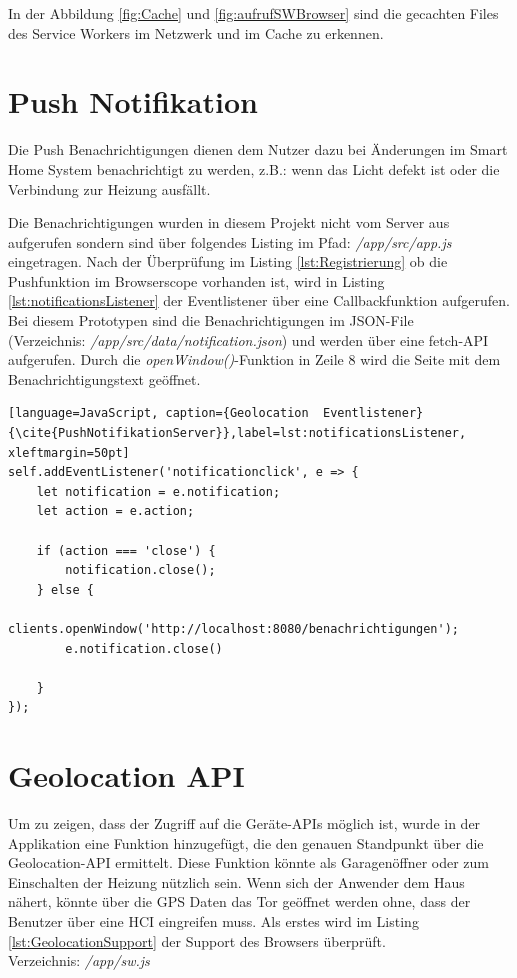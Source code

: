 In der Abbildung \ref{fig:Cache} und \ref{fig:aufrufSWBrowser} sind die gecachten Files des Service Workers im Netzwerk und im Cache zu erkennen.



\clearpage
\section{Push Notifikation}
Die Push Benachrichtigungen dienen dem Nutzer dazu bei Änderungen im Smart Home System benachrichtigt zu werden, z.B.: wenn das Licht defekt ist oder die Verbindung zur Heizung ausfällt.

Die Benachrichtigungen wurden in diesem Projekt nicht vom Server aus aufgerufen sondern sind über folgendes Listing im Pfad: \textit{/app/src/app.js} eingetragen. 
Nach der Überprüfung im Listing \ref{lst:Registrierung} ob die Pushfunktion im Browserscope vorhanden ist, wird in Listing \ref{lst:notificationsListener} der  Eventlistener über eine Callbackfunktion aufgerufen. Bei diesem Prototypen sind die Benachrichtigungen im JSON-File\\ (Verzeichnis: \textit{/app/src/data/notification.json}) und werden über eine fetch-API aufgerufen. Durch die \textit{openWindow()}-Funktion in Zeile 8 wird die Seite mit dem Benachrichtigungstext geöffnet.  
\\
\begin{lstlisting}[language=JavaScript, caption={Geolocation  Eventlistener} {\cite{PushNotifikationServer}},label=lst:notificationsListener, xleftmargin=50pt]
self.addEventListener('notificationclick', e => {
    let notification = e.notification;
    let action = e.action;

    if (action === 'close') {
        notification.close();
    } else {
        clients.openWindow('http://localhost:8080/benachrichtigungen');
        e.notification.close()

    }
});
\end{lstlisting}
\clearpage

\section{Geolocation API}
Um zu zeigen, dass der Zugriff auf die Geräte-APIs möglich ist, wurde in der Applikation eine Funktion hinzugefügt, die den genauen Standpunkt über die Geolocation-API ermittelt. Diese Funktion könnte als Garagenöffner oder zum Einschalten der Heizung nützlich sein. Wenn sich der Anwender dem Haus nähert, könnte über die GPS Daten das Tor geöffnet werden ohne, dass der Benutzer über eine HCI eingreifen muss. 
Als erstes wird im Listing \ref{lst:GeolocationSupport} der Support des Browsers überprüft.\\
Verzeichnis: \textit{/app/sw.js}

